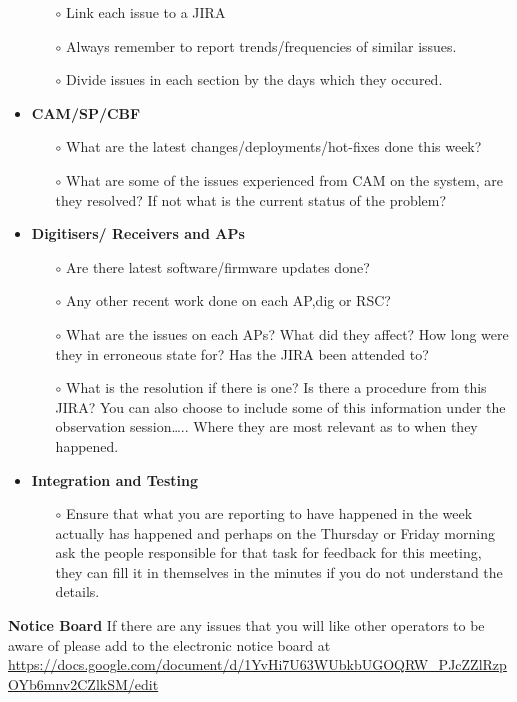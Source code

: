 \begin{itemize}
\begin{itemize}
\item[$\circ$] Link each issue to a JIRA
\item[$\circ$] Always remember to report trends/frequencies of similar issues.
\item[$\circ$] Divide issues in each section by the days which they occured.
\end{itemize}
\item \textbf{CAM/SP/CBF}
\begin{itemize} 
\item[$\circ$] What are the latest changes/deployments/hot-fixes done this week?
\item[$\circ$] What are some of the issues experienced from CAM on the system, are they resolved? If not what is the current status of the problem?
\end{itemize}
\item \textbf{Digitisers/ Receivers and APs}
\begin{itemize} 
\item[$\circ$] Are there latest software/firmware updates done?
\item[$\circ$] Any other recent work done on each AP,dig or RSC?
\item[$\circ$] What are the issues on each APs? What did they affect? How long were they in erroneous state for? Has the JIRA been attended to? 
\item[$\circ$] What is the resolution if there is one? Is there a procedure from this JIRA? You can also choose to include some of this information under the observation session….. Where they are most relevant as to when they happened.
\end{itemize}
\item \textbf{Integration and Testing}
\begin{itemize} 
\item[$\circ$]Ensure that what you are reporting to have happened in the week actually has happened and perhaps on the Thursday or Friday morning ask the people responsible for that task for feedback for this meeting, they can fill it in themselves in the minutes if you do not understand the details.
\end{itemize}
\end{itemize}
\textbf{Notice Board}
If there are any issues that you will like other operators to be aware of please add to the electronic notice board at \url{https://docs.google.com/document/d/1YvHi7U63WUbkbUGOQRW\_PJcZZlRzpOYb6mnv2CZlkSM/edit}

